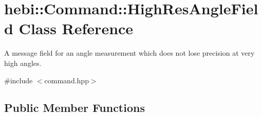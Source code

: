 \hypertarget{classhebi_1_1Command_1_1HighResAngleField}{}\section{hebi\+:\+:Command\+:\+:High\+Res\+Angle\+Field Class Reference}
\label{classhebi_1_1Command_1_1HighResAngleField}


A message field for an angle measurement which does not lose precision at very high angles.  




{\ttfamily \#include $<$command.\+hpp$>$}

\subsection*{Public Member Functions}
